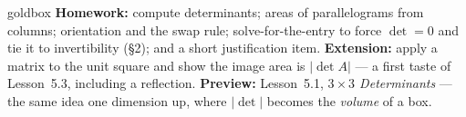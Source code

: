 \documentclass[10pt]{article}
\begin{document}
\begin{skillbox}{goldbox}
\textbf{Homework:} compute determinants; areas of parallelograms from columns; orientation and the
swap rule; solve-for-the-entry to force $\det=0$ and tie it to invertibility (§2); and a short
justification item. \textbf{Extension:} apply a matrix to the unit square and show the image area is
$|\det A|$ --- a first taste of Lesson~5.3, including a reflection. \textbf{Preview:} Lesson~5.1,
\emph{$3\times3$ Determinants} --- the same idea one dimension up, where $|\det|$ becomes the
\emph{volume} of a box.
\end{skillbox}
\end{document}
